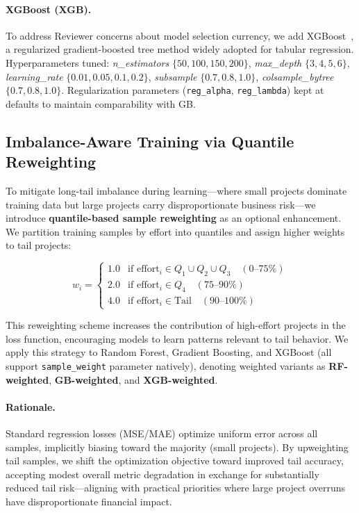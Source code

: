 \documentclass{ieeeaccess}
\begin{document}
\paragraph{XGBoost (XGB).}
To address Reviewer concerns about model selection currency, we add XGBoost~\cite{chen2016xgboost}, a regularized gradient-boosted tree method widely adopted for tabular regression.
Hyperparameters tuned:
\emph{n\_estimators} $\{50,100,150,200\}$,
\emph{max\_depth} $\{3,4,5,6\}$,
\emph{learning\_rate} $\{0.01,0.05,0.1,0.2\}$,
\emph{subsample} $\{0.7,0.8,1.0\}$,
\emph{colsample\_bytree} $\{0.7,0.8,1.0\}$.
Regularization parameters (\texttt{reg\_alpha}, \texttt{reg\_lambda}) kept at defaults to maintain comparability with GB.

\subsection{Imbalance-Aware Training via Quantile Reweighting}
\label{sec:imbalance-aware}

To mitigate long-tail imbalance during learning—where small projects dominate training data but large projects carry disproportionate business risk—we introduce \textbf{quantile-based sample reweighting} as an optional enhancement. We partition training samples by effort into quantiles and assign higher weights to tail projects:

\begin{equation}
w_i = \begin{cases}
1.0 & \text{if effort}_i \in Q_1 \cup Q_2 \cup Q_3 \quad (0\text{--}75\%) \\
2.0 & \text{if effort}_i \in Q_4 \quad (75\text{--}90\%) \\
4.0 & \text{if effort}_i \in \text{Tail} \quad (90\text{--}100\%)
\end{cases}
\end{equation}

This reweighting scheme increases the contribution of high-effort projects in the loss function, encouraging models to learn patterns relevant to tail behavior. We apply this strategy to Random Forest, Gradient Boosting, and XGBoost (all support \texttt{sample\_weight} parameter natively), denoting weighted variants as \textbf{RF-weighted}, \textbf{GB-weighted}, and \textbf{XGB-weighted}.

\paragraph{Rationale.}
Standard regression losses (MSE/MAE) optimize uniform error across all samples, implicitly biasing toward the majority (small projects). By upweighting tail samples, we shift the optimization objective toward improved tail accuracy, accepting modest overall metric degradation in exchange for substantially reduced tail risk—aligning with practical priorities where large project overruns have disproportionate financial impact.
\end{document}
